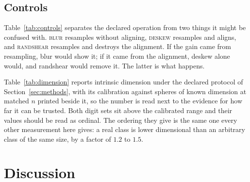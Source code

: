 \documentclass[10pt]{article}
\theoremstyle{plain}
\theoremstyle{definition}
\theoremstyle{remark}
\newcommand{\fitwidth}[1]{%
  \resizebox{\ifdim\width>\linewidth\linewidth\else\width\fi}{!}{#1}}
\begin{document}
\begin{table}[!htbp]\centering\small
\fitwidth{}
\caption{\small The accuracy knee --- the smallest $n$ per class reaching
$95\%$ of that classifier's own maximum --- and the drift of the within-class
median from the first grid point. The knee is a per-condition quantity and is
not comparable across quotients.}
\label{tab:learning}
\end{table}

\subsection{Controls}

Table~\ref{tab:controls} separates the declared operation from two things it
might be confused with. \textsc{blur} resamples without aligning, \textsc{deskew}
resamples and aligns, and \textsc{randshear} resamples and destroys the
alignment. If the gain came from resampling, blur would show it; if it came
from the alignment, deskew alone would, and randshear would remove it. The
latter is what happens.

Table~\ref{tab:dimension} reports intrinsic dimension under the declared
protocol of Section~\ref{sec:methods}, with its calibration against spheres of
known dimension at matched $n$ printed beside it, so the number is read next to
the evidence for how far it can be trusted. Both digit sets sit above the
calibrated range and their values should be read as ordinal. The ordering they
give is the same one every other measurement here gives: a real class is lower
dimensional than an arbitrary class of the same size, by a factor of $1.2$ to
$1.5$.

\begin{table}[!htbp]\centering\small
\fitwidth{}
\caption{\small Resampling against alignment on MNIST.
$P(d_{\mathrm{within}} < d_{\mathrm{between}})$ at $n=640$.}
\label{tab:controls}
\end{table}

\begin{table}[!htbp]\centering\small
\fitwidth{}
\caption{\small Intrinsic dimension under the declared protocol, with the
calibration that bounds its interpretation.}
\label{tab:dimension}
\end{table}


\section{Discussion}
\label{sec:discussion}
\end{document}
